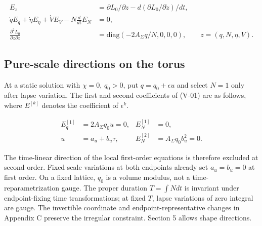 \begin{equation}\tag{H-05}\label{eq:H-05}
\begin{aligned}
E_z&=\partial L_0/\partial z-d(\partial L_0/\partial\dot z)/dt,\\
\dot qE_q+\dot\eta E_{\eta}+\dot V E_V-N\frac d{dt}E_N&=0,\\
\frac{\partial^2L_0}{\partial\dot z\partial\dot z}
&=\mathrm{diag}(-2A_{\Sigma}q/N,0,0,0),\qquad z=(q,N,\eta,V).
\end{aligned}
\end{equation}

\subsection{Pure-scale directions on the torus}

At a static solution with $\chi=0$, $q_0>0$, put $q=q_0+\epsilon u$ and select $N=1$ only after lapse variation. The first and second coefficients of (V-01) are as follows, where $E^{[k]}$ denotes the coefficient of $\epsilon^k$.

\begin{equation}\tag{H-06}\label{eq:H-06}
\begin{aligned}
E_q^{[1]}&=2A_{\Sigma}q_0\ddot u=0,& E_N^{[1]}&=0,\\
u&=a_u+b_u\tau,& E_N^{[2]}&=A_{\Sigma}q_0 b_u^2=0.
\end{aligned}
\end{equation}

The time-linear direction of the local first-order equations is therefore excluded at second order. Fixed scale variations at both endpoints already set $a_u=b_u=0$ at first order. On a fixed lattice, $q_0$ is a volume modulus, not a time-reparametrization gauge. The proper duration $T=\int Ndt$ is invariant under endpoint-fixing time transformations; at fixed $T$, lapse variations of zero integral are gauge. The invertible coordinate and endpoint-representative changes in Appendix C preserve the irregular constraint. Section 5 allows shape directions.
